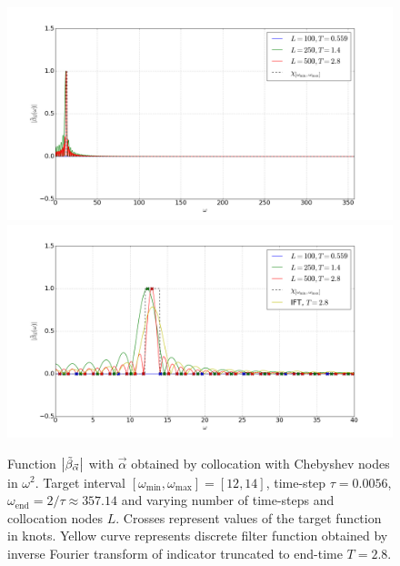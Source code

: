 \documentclass[a4paper,11pt,bibliography=totoc,listof=totoc,headinclude=true,cleardoublepage=empty,oneside]{scrbook}
\newcommand{\dffv}{\Tilde{\beta}_{\Vec{\alpha}}}
\newcommand{\e}{\mathrm{end}}
\begin{document}
\begin{figure}
    \centering
    \includegraphics[width=1\linewidth]{latex//images//cheb_coll/Figure_1.png}
    \includegraphics[width=1\linewidth]{latex//images//cheb_coll/Figure_2.png}
    \caption{Function $\left|\dffv\right|$ with $\Vec{\alpha}$ obtained by collocation with Chebyshev nodes in $\omega^2$. Target interval $\left[\omega_{\min}, \omega_{\max} \right] = [12, 14]$, time-step $\tau = 0.0056$, $\omega_\e = 2/\tau \approx 357.14$ and varying number of time-steps and collocation nodes $L$. Crosses represent values of the target function in knots. Yellow curve represents discrete filter function obtained by inverse Fourier transform of indicator truncated to end-time $T=2.8$.}
    \label{fig:cheb coll 1}
\end{figure}
\end{document}

